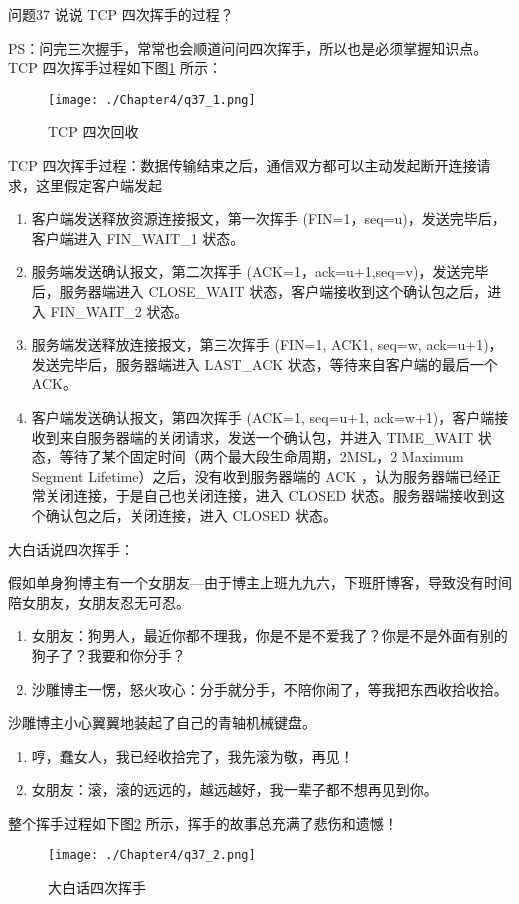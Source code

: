 \documentclass[cn,11pt,color=blue,lang=cn]{elegantbook}
\begin{document}
\begin{custom}{问题37}
说说 TCP 四次挥手的过程？
\end{custom}
\begin{solution}
PS：问完三次握手，常常也会顺道问问四次挥手，所以也是必须掌握知识点。TCP 四次挥手过程如下图\ref{fig37_1} 所示：

\begin{figure}[htbp]
\centering
\texttt{[image: ./Chapter4/q37\_1.png]}
\caption{TCP 四次回收}
\label{fig37_1}
\end{figure}


TCP 四次挥手过程：数据传输结束之后，通信双方都可以主动发起断开连接请求，这里假定客户端发起

\begin{enumerate}
	\item 客户端发送释放资源连接报文，第一次挥手 (FIN=1，seq=u)，发送完毕后，客户端进入 FIN\_WAIT\_1 状态。
	\item 服务端发送确认报文，第二次挥手 (ACK=1，ack=u+1,seq=v)，发送完毕后，服务器端进入 CLOSE\_WAIT 状态，客户端接收到这个确认包之后，进入 FIN\_WAIT\_2 状态。
	\item 服务端发送释放连接报文，第三次挥手 (FIN=1, ACK1, seq=w, ack=u+1)，发送完毕后，服务器端进入 LAST\_ACK 状态，等待来自客户端的最后一个 ACK。
	\item 客户端发送确认报文，第四次挥手 (ACK=1, seq=u+1, ack=w+1)，客户端接收到来自服务器端的关闭请求，发送一个确认包，并进入 TIME\_WAIT 状态，等待了某个固定时间（两个最大段生命周期，2MSL，2 Maximum Segment Lifetime）之后，没有收到服务器端的 ACK ，认为服务器端已经正常关闭连接，于是自己也关闭连接，进入 CLOSED 状态。服务器端接收到这个确认包之后，关闭连接，进入 CLOSED 状态。
\end{enumerate}

大白话说四次挥手：

假如单身狗博主有一个女朋友—由于博主上班九九六，下班肝博客，导致没有时间陪女朋友，女朋友忍无可忍。

\begin{enumerate}
	\item 女朋友：狗男人，最近你都不理我，你是不是不爱我了？你是不是外面有别的狗子了？我要和你分手？
	\item 沙雕博主一愣，怒火攻心：分手就分手，不陪你闹了，等我把东西收拾收拾。
\end{enumerate}
沙雕博主小心翼翼地装起了自己的青轴机械键盘。
\begin{enumerate}
	\item 哼，蠢女人，我已经收拾完了，我先滚为敬，再见！
	\item 女朋友：滚，滚的远远的，越远越好，我一辈子都不想再见到你。
\end{enumerate}
整个挥手过程如下图\ref{fig37_2} 所示，挥手的故事总充满了悲伤和遗憾！
\begin{figure}[htbp]
\centering
\texttt{[image: ./Chapter4/q37\_2.png]}
\caption{大白话四次挥手}
\label{fig37_2}
\end{figure}

\end{solution}
\end{document}
